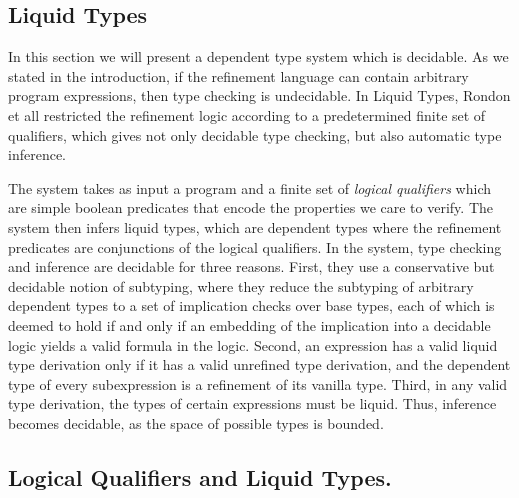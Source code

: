 %

\subsection{Liquid Types}\label{sec:liquid}

In this section we will present a dependent type system which is decidable.
As we stated in the introduction, if the refinement language can contain arbitrary 
program expressions, then type checking is undecidable.
%
In Liquid Types\cite{LiquidPLDI08},  Rondon et all restricted the refinement logic according to a predetermined 
finite set of qualifiers,  which gives not only decidable type checking, but also automatic
type inference.



The system takes as input a program and 
a finite set of \textit{logical qualifiers}
which are simple boolean predicates 
that encode the properties we care to verify. 
The system then infers
liquid types, which are dependent types where the refinement predicates are conjunctions of the logical qualifiers.
In the system, type checking and inference are decidable for
three reasons. 
%
First, they use a conservative but decidable
notion of subtyping, where they reduce the subtyping of arbitrary
dependent types to a set of implication checks over base types,
each of which is deemed to hold if and only if an embedding of
the implication into a decidable logic yields a valid formula in
the logic. 
%
Second, an expression has a valid liquid type derivation
only if it has a valid unrefined type derivation, and the dependent 
type of every subexpression is a refinement of its vanilla type. 
%
Third, in any valid type derivation, the types of certain expressions
must be liquid. Thus, inference becomes decidable, as the space of
possible types is bounded. 


\subsection{Logical Qualifiers and Liquid Types.}

